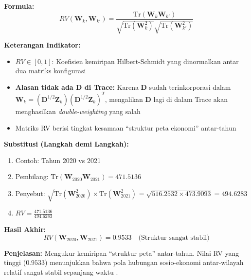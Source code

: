 \documentclass[11pt,a4paper]{article}
\begin{document}
\begin{tcolorbox}[formula_box, title={14. Koefisien RV (Matriks Inter-Struktur)}]
\textbf{Formula:}
\[ RV(\mathbf{W}_k,\mathbf{W}_{k'}) = \frac{\mathrm{Tr}(\mathbf{W}_k \mathbf{W}_{k'})}{\sqrt{\mathrm{Tr}(\mathbf{W}_k^2)} \sqrt{\mathrm{Tr}(\mathbf{W}_{k'}^2)}} \]

\textbf{Keterangan Indikator:}
\begin{itemize}
  \item $RV \in [0,1]$: Koefisien kemiripan Hilbert-Schmidt yang dinormalkan antar dua matriks konfigurasi \citet{oliveira2024}
  \item \textbf{Alasan tidak ada $\mathbf{D}$ di Trace:} Karena $\mathbf{D}$ sudah terinkorporasi dalam $\mathbf{W}_k = (\mathbf{D}^{1/2}\mathbf{Z}_k)(\mathbf{D}^{1/2}\mathbf{Z}_k)^T$, mengalikan $\mathbf{D}$ lagi di dalam Trace akan menghasilkan \textit{double-weighting} yang salah \citet{lavit94}
  \item Matriks RV berisi tingkat kesamaan ``struktur peta ekonomi'' antar-tahun
\end{itemize}

\textbf{Substitusi (Langkah demi Langkah):}
\begin{enumerate}
  \item Contoh: Tahun 2020 vs 2021
  \item Pembilang: $\mathrm{Tr}(\mathbf{W}_{2020} \mathbf{W}_{2021}) = 471.5136$
  \item Penyebut: $\sqrt{\mathrm{Tr}(\mathbf{W}_{2020}^2) \times \mathrm{Tr}(\mathbf{W}_{2021}^2)} = \sqrt{516.2532 \times 473.9093} = 494.6283$
  \item $RV = \frac{471.5136}{494.6283}$
\end{enumerate}

\textbf{Hasil Akhir:}
\[ RV(\mathbf{W}_{2020}, \mathbf{W}_{2021}) = 0.9533 \quad \text{(Struktur sangat stabil)} \]

\textbf{Penjelasan:} Mengukur kemiripan ``struktur peta'' antar-tahun. Nilai RV yang tinggi ($0.9533$) menunjukkan bahwa pola hubungan sosio-ekonomi antar-wilayah relatif sangat stabil sepanjang waktu \citet{lavit94}.
\end{tcolorbox}
\end{document}
